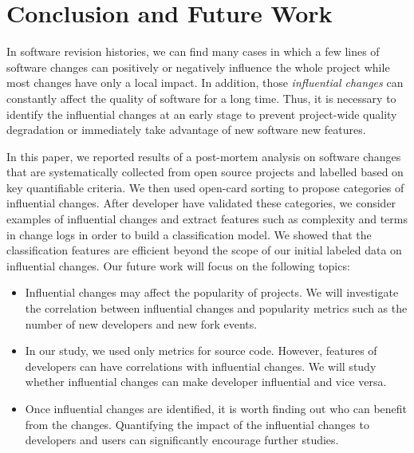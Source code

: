 \section{Conclusion and Future Work}
\label{sec:conclusion}

In software revision histories, we can find many cases in which a few lines of
software changes can positively or negatively influence the whole project
while most changes have only a local impact. In addition, those
\emph{influential changes} can constantly affect the quality of software for a
long time. Thus, it is necessary to identify the influential changes at an
early stage to prevent project-wide quality degradation or immediately
take advantage of new software new features.

In this paper, we reported results of a post-mortem analysis on \numChanges
software changes that are systematically collected from \numSubjects open
source projects  and labelled based on key quantifiable criteria. We then
used open-card sorting to propose categories of influential changes.
After developer have validated these categories, we consider examples of
influential changes and extract features such as 
complexity and terms in change logs in order to build a classification model.
We showed that the classification features are efficient beyond the scope
of our initial labeled data on influential changes. 
Our future work will focus on the following topics: 

\begin{itemize}
  \item Influential changes may affect the popularity of projects. We will
  investigate the correlation between influential changes and popularity metrics
  such as the number of new developers and new fork events.
  \item In our study, we used only metrics for source code. However, features of
  developers can have correlations with influential changes. We will study
  whether influential changes can make developer influential and vice versa.
  \item Once influential changes are identified, it is worth finding out who can
  benefit from the changes. Quantifying the impact of the influential changes to
  developers and users can significantly encourage further studies.
\end{itemize}
